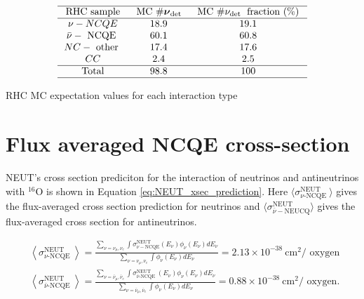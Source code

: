 \begin{table}
    $$
    \begin{array}{ccc}
    \hline \text { RHC sample } & \text { MC } \# \boldsymbol{\nu}_{\text {det }} & \text { MC } \# \nu_{\text {det }} \text { fraction (\%) } \\
    \hline \nu-N C Q E & 18.9 & 19.1 \\
    \bar{\nu}-\text { NCQE } & 60.1 & 60.8 \\
    N C-\text { other } & 17.4 & 17.6 \\
    C C & 2.4 & 2.5 \\
    \hline \text { Total } & 98.8 & 100 \\
    \hline
    \end{array}
    $$
    \caption{RHC MC expectation values for each interaction type}
    \label{table:nu_RHC_mc}
\end{table}




\section{Flux averaged NCQE cross-section}

NEUT's cross section prediciton for the interaction of neutrinos and antineutrinos with ${ }^{16} \mathrm{O}$ is shown in Equation \ref{eq:NEUT_xsec_prediction}. Here $\langle\sigma_{\nu \text {-NCQE }}^{\text {NEUT }}\rangle$ gives the flux-averaged cross section prediction for neutrinos and $\langle\sigma_{\bar{\nu}-\mathrm{NEUCQ}}^{\mathrm{NEUT}}\rangle$ gives the flux-averaged cross section for antineutrinos. 


\begin{equation}
    \begin{aligned}
    &\left\langle\sigma_{\nu \text {-NCQE }}^{\mathrm{NEUT}}\right\rangle= \frac{\sum_{\nu=\nu_\mu, \nu_e} \int \sigma_{\nu-\mathrm{NCQE}}^{\mathrm{NEUT}}\left(E_\nu\right) \phi_\nu\left(E_\nu\right) d E_\nu}{\sum_{\nu=\nu_\mu, \nu_e} \int \phi_\nu\left(E_\nu\right) d E_\nu}=2.13 \times 10^{-38} \mathrm{~cm}^2 / \text { oxygen } \\
    &\left\langle\sigma_{\bar{\nu} \text {-NCQE }}^{\mathrm{NEUT}}\right\rangle=\frac{\sum_{\nu=\bar{\nu}_\mu, \bar{\nu}_e} \int \sigma_{\bar{\nu} \text {-NCQE }}^{\mathrm{NEUT}}\left(E_\nu\right) \phi_\nu\left(E_\nu\right) d E_\nu}{\sum_{\nu=\bar{\nu}_\mu, \bar{\nu}_e} \int \phi_\nu\left(E_\nu\right) d E_\nu}=0.88 \times 10^{-38} \mathrm{~cm}^2 / \text { oxygen. }
    \end{aligned}
\label{eq:NEUT_xsec_prediction}
\end{equation}


